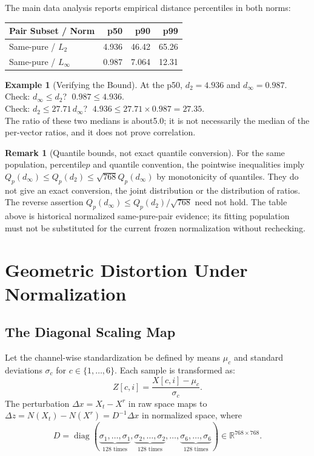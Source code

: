 \documentclass[11pt, a4paper]{article}
\theoremstyle{definition}
\newtheorem{example}{Example}[section]
\newtheorem{remark}{Remark}[section]
\theoremstyle{plain}
\newcommand{\R}{\mathbb{R}}
\begin{document}
The main data analysis reports empirical distance percentiles in both norms:

\begin{center}
\small
\begin{tabular}{@{}lrrr@{}}
\toprule
Pair Subset / Norm & p50 & p90 & p99 \\
\midrule
Same-pure / $L_2$ & 4.936 & 46.42 & 65.26 \\
Same-pure / $L_\infty$ & 0.987 & 7.064 & 12.31 \\
\bottomrule
\end{tabular}
\end{center}

\begin{example}[Verifying the Bound]
  At the p50, $d_2 = 4.936$ and $d_\infty = 0.987$.
  Check: $d_\infty \le d_2$? $\;0.987 \le 4.936$. \checkmark \\
  Check: $d_2 \le 27.71 \, d_\infty$? $\;4.936 \le 27.71 \times 0.987 = 27.35$. \checkmark \\
  The ratio of these two medians is about5.0; it is not necessarily
  the median of the per-vector ratios, and it does not prove correlation.
\end{example}

\begin{remark}[Quantile bounds, not exact quantile conversion]
For the same population, percentile$p$ and quantile convention, the pointwise
inequalities imply $Q_p(d_\infty)\le Q_p(d_2)\le\sqrt{768}Q_p(d_\infty)$
by monotonicity of quantiles. They do not give an exact conversion, the
joint distribution or the distribution of ratios. The reverse assertion
$Q_p(d_\infty)\le Q_p(d_2)/\sqrt{768}$ need not hold. The table above is
historical normalized same-pure-pair evidence; its fitting population must
not be substituted for the current frozen normalization without rechecking.
\end{remark}

\section{Geometric Distortion Under Normalization}

\subsection{The Diagonal Scaling Map}

Let the channel-wise standardization be defined by means $\mu_c$ and standard
deviations $\sigma_c$ for $c \in \{1, \ldots, 6\}$. Each sample is transformed as:
\[
  Z[c, i] = \frac{X[c, i] - \mu_c}{\sigma_c}.
\]
The perturbation $\Delta x = X_t - X^r$ in raw space maps to
$\Delta z = N(X_t) - N(X^r) = D^{-1} \Delta x$ in normalized space, where
\[
  D = \operatorname{diag}(\underbrace{\sigma_1, \ldots, \sigma_1}_{128 \text{ times}},
                           \underbrace{\sigma_2, \ldots, \sigma_2}_{128 \text{ times}},
                           \ldots,
                           \underbrace{\sigma_6, \ldots, \sigma_6}_{128 \text{ times}})
  \in \R^{768 \times 768}.
\]
\end{document}
